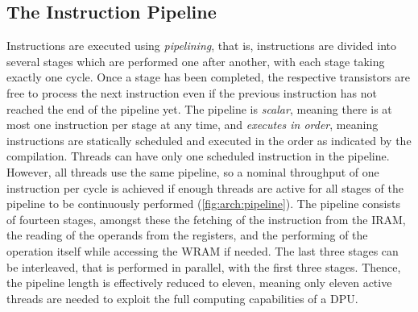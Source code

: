 \subsection{The Instruction Pipeline}
\label{sec:prereq:arch:pipeline}

Instructions are executed using \emph{pipelining}, that is, instructions are divided into several stages which are performed one after another, with each stage taking exactly one cycle.
Once a stage has been completed, the respective transistors are free to process the next instruction even if the previous instruction has not reached the end of the pipeline yet.
The pipeline is \emph{scalar}, meaning there is at most one instruction per stage at any time, and \emph{executes in order}, meaning instructions are statically scheduled and executed in the order as indicated by the compilation.
Threads can have only one scheduled instruction in the pipeline.
However, all threads use the same pipeline, so a nominal throughput of one instruction per cycle is achieved if enough threads are active for all stages of the pipeline to be continuously performed (\cref{fig:arch:pipeline}).
The pipeline consists of fourteen stages, amongst these the fetching of the instruction from the \ac{IRAM}, the reading of the operands from the registers, and the performing of the operation itself while accessing the \ac{WRAM} if needed.
The last three stages can be interleaved, that is performed in parallel, with the first three stages.
Thence, the pipeline length is effectively reduced to eleven, meaning only eleven active threads are needed to exploit the full computing capabilities of a DPU.

